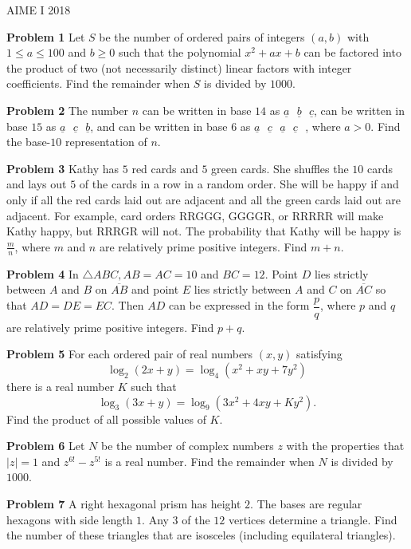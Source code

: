 \documentclass[a4paper,11pt]{article}
\begin{document}
\begin{center}
\begin{LARGE}
AIME I 2018
\end{LARGE}
\end{center}

\textbf{Problem 1}
Let $S$ be the number of ordered pairs of integers $(a,b)$ with $1 \leq a \leq 100$ and $b \geq 0$ such that the polynomial $x^2+ax+b$ can be factored into the product of two (not necessarily distinct) linear factors with integer coefficients. Find the remainder when $S$ is divided by $1000$.

\textbf{Problem 2}
The number $n$ can be written in base $14$ as $\underline{a}\text{ }\underline{b}\text{ }\underline{c}$, can be written in base $15$ as $\underline{a}\text{ }\underline{c}\text{ }\underline{b}$, and can be written in base $6$ as $\underline{a}\text{ }\underline{c}\text{ }\underline{a}\text{ }\underline{c}\text{ }$, where $a > 0$. Find the base-$10$ representation of $n$.

\textbf{Problem 3}
Kathy has $5$ red cards and $5$ green cards. She shuffles the $10$ cards and lays out $5$ of the cards in a row in a random order. She will be happy if and only if all the red cards laid out are adjacent and all the green cards laid out are adjacent. For example, card orders RRGGG, GGGGR, or RRRRR will make Kathy happy, but RRRGR will not. The probability that Kathy will be happy is $\frac{m}{n}$, where $m$ and $n$ are relatively prime positive integers. Find $m + n$.

\textbf{Problem 4}
In $\triangle ABC, AB = AC = 10$ and $BC = 12$. Point $D$ lies strictly between $A$ and $B$ on $\overline{AB}$ and point $E$ lies strictly between $A$ and $C$ on $\overline{AC}$ so that $AD = DE = EC$. Then $AD$ can be expressed in the form $\dfrac{p}{q}$, where $p$ and $q$ are relatively prime positive integers. Find $p+q$.

\textbf{Problem 5}
For each ordered pair of real numbers $(x,y)$ satisfying \[\log_2(2x+y) = \log_4(x^2+xy+7y^2)\]there is a real number $K$ such that \[\log_3(3x+y) = \log_9(3x^2+4xy+Ky^2).\]Find the product of all possible values of $K$.

\textbf{Problem 6}
Let $N$ be the number of complex numbers $z$ with the properties that $|z|=1$ and $z^{6!}-z^{5!}$ is a real number. Find the remainder when $N$ is divided by $1000$.

\textbf{Problem 7}
A right hexagonal prism has height $2$. The bases are regular hexagons with side length $1$. Any $3$ of the $12$ vertices determine a triangle. Find the number of these triangles that are isosceles (including equilateral triangles).
\end{document}
